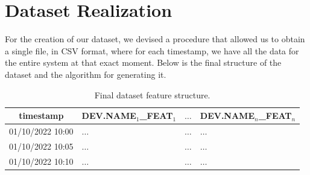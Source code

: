 \section{Dataset Realization}
For the creation of our dataset, we devised a procedure that
allowed us to obtain a single file, in CSV format, where for
each timestamp, we have all the data for the entire system at
that exact moment. Below is the final structure of the dataset
and the algorithm for generating it.



\begin{table}[H]
	\begin{center}
		\begin{tabular}[c]{l|l|l|l}
			\hline
			\multicolumn{1}{c|}{\textbf{timestamp}}              &
			\multicolumn{1}{c|}{\textbf{DEV.NAME$_1$\_FEAT$_1$}} &
			\multicolumn{1}{c|}{$\ldots$}                        &
			\multicolumn{1}{c}{\textbf{DEV.NAME$_n$\_FEAT$_n$}}                                   \\
			\hline

			01/10/2022 10:00                                     & $\ldots$ & $\ldots$ & $\ldots$ \\
			01/10/2022 10:05                                     & $\ldots$ & $\ldots$ & $\ldots$ \\
			01/10/2022 10:10                                     & $\ldots$ & $\ldots$ & $\ldots$ \\
			\hline
		\end{tabular}
	\end{center}
	\caption{Final dataset feature structure.}\label{tab:datasetform}
\end{table}

